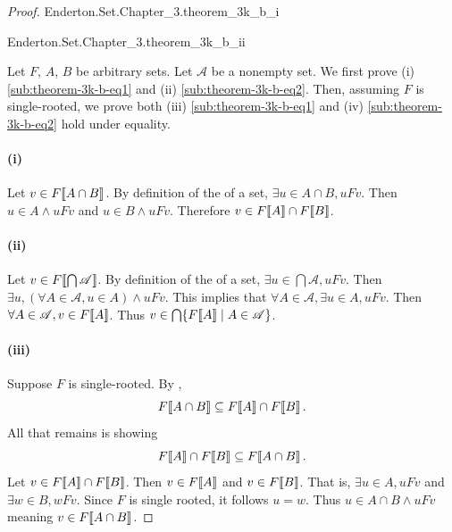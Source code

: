 \documentclass{report}
\begin{document}
\begin{proof}

  \statementpadding

    {Enderton.Set.Chapter\_3.theorem\_3k\_b\_i}

    {Enderton.Set.Chapter\_3.theorem\_3k\_b\_ii}

  Let $F$, $A$, $B$ be arbitrary sets.
  Let $\mathscr{A}$ be a nonempty set.
  We first prove (i) \eqref{sub:theorem-3k-b-eq1} and (ii)
    \eqref{sub:theorem-3k-b-eq2}.
  Then, assuming $F$ is single-rooted, we prove both (iii)
    \eqref{sub:theorem-3k-b-eq1} and (iv) \eqref{sub:theorem-3k-b-eq2} hold
    under equality.

  \paragraph{(i)}%
  \label{par:theorem-3k-b-i}

    Let $v \in F\!\left\llbracket A \cap B\right\rrbracket$.
    By definition of the  of a set,
      $\exists u \in A \cap B, uFv$.
    Then $u \in A \land uFv$ and $u \in B \land uFv$.
    Therefore $v \in F\!\left\llbracket A\right\rrbracket \cap F\!\left\llbracket B\right\rrbracket$.

  \paragraph{(ii)}%
  \label{par:theorem-3k-b-ii}

    Let $v \in F\!\left\llbracket\bigcap{\mathscr{A}}\right\rrbracket$.
    By definition of the  of a set,
      $\exists u \in \bigcap{\mathscr{A}}, uFv$.
    Then $\exists u, (\forall A \in \mathscr{A}, u \in A) \land uFv$.
    This implies that $\forall A \in \mathscr{A}, \exists u \in A, uFv$.
    Then $\forall A \in \mathscr{A}, v \in F\!\left\llbracket A\right\rrbracket$.
    Thus $v \in \bigcap\{F\!\left\llbracket A\right\rrbracket \mid A \in \mathscr{A}\}$.

  \paragraph{(iii)}%

    Suppose $F$ is single-rooted.
    By ,
      $$F\!\left\llbracket A \cap B\right\rrbracket \subseteq F\!\left\llbracket A\right\rrbracket \cap F\!\left\llbracket B\right\rrbracket.$$
    All that remains is showing
      $$F\!\left\llbracket A\right\rrbracket \cap F\!\left\llbracket B\right\rrbracket \subseteq F\!\left\llbracket A \cap B\right\rrbracket.$$
    Let $v \in F\!\left\llbracket A\right\rrbracket \cap F\!\left\llbracket B\right\rrbracket$.
    Then $v \in F\!\left\llbracket A\right\rrbracket$ and $v \in F\!\left\llbracket B\right\rrbracket$.
    That is, $\exists u \in A, uFv$ and $\exists w \in B, wFv$.
    Since $F$ is single rooted, it follows $u = w$.
    Thus $u \in A \cap B \land uFv$ meaning $v \in F\!\left\llbracket A \cap B\right\rrbracket$.


\end{proof}
\end{document}
